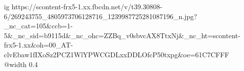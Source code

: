  
 
 
 
 

\ifcmt
  ig https://scontent-frx5-1.xx.fbcdn.net/v/t39.30808-6/269243755_4805973706128716_1239987725281087196_n.jpg?_nc_cat=105&ccb=1-5&_nc_sid=b9115d&_nc_ohc=ZZBq_v0sbvcAX8TtxNj&_nc_ht=scontent-frx5-1.xx&oh=00_AT-clvEbaw1fIXoSz2PCZ1WlYPWCGDLxxDDLOfcP50txpg&oe=61C7CFFF
  @width 0.4
\fi
